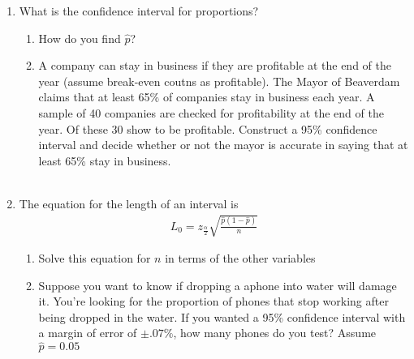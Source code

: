 \newpage
\begin{enumerate}
\item What is the confidence interval for proportions? 
\begin{enumerate}
\item How do you find $\hat{p}$?
\item A company can stay in business if they are profitable at the end of the year (assume break-even coutns as profitable). The Mayor of Beaverdam claims that at least 65\% of companies stay in business each year. A sample of 40 companies are checked for profitability at the end of the year. Of these 30 show to be profitable. Construct a 95\% confidence interval and decide whether or not the mayor is accurate in saying that at least 65\% stay in business.
\\ \\
\end{enumerate}
\item The equation for the length of an interval is 
\begin{eqnarray*}
L_{0} = z_{\frac{\alpha}{2}}\sqrt{\frac{\hat{p}(1-\hat{p})}{n}}
\end{eqnarray*}
\begin{enumerate}
\item Solve this equation for $n$ in terms of the other variables
\item Suppose you want to know if dropping a aphone into water will damage it. You're looking for the proportion of phones that stop working after being dropped in the water. If you wanted a 95\% confidence interval with a margin of error of $\pm .07\%$, how many phones do you test? Assume $\hat{p}=0.05$
\end{enumerate}
\end{enumerate}
\newpage
